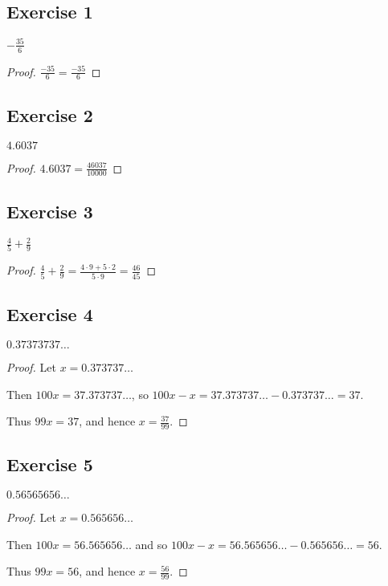 \documentclass[14pt]{extarticle}
\newcommand{\dps}{\displaystyle}
\begin{document}
\subsection{Exercise 1}
$\dps-\frac{35}{6}$

\begin{proof}
    $\frac{-35}{6} = \frac{-35}{6}$
\end{proof}

\subsection{Exercise 2}
$4.6037$

\begin{proof}
    $4.6037 = \frac{46037}{10000}$
\end{proof}

\subsection{Exercise 3}
$\dps\frac{4}{5} + \frac{2}{9}$

\begin{proof}
    $\dps\frac{4}{5} + \frac{2}{9} = \frac{4 \cdot 9 + 5 \cdot 2}{5 \cdot 9} = \frac{46}{45}$
\end{proof}

\subsection{Exercise 4}
$0.37373737\ldots$

\begin{proof}
    Let $x = 0.373737\ldots$

    Then $100x = 37.373737\ldots$, so $100x - x = 37.373737\ldots - 0.373737\ldots = 37$.

    Thus $99x = 37$, and hence $x = \frac{37}{99}$.
\end{proof}

\subsection{Exercise 5}
$0.56565656\ldots$

\begin{proof}
    Let $x = 0.565656\ldots$

    Then $100x = 56.565656\ldots$ and so $100x - x = 56.565656\ldots - 0.565656\ldots = 56$.

    Thus $99x = 56$, and hence $x = \frac{56}{99}$.
\end{proof}
\end{document}

